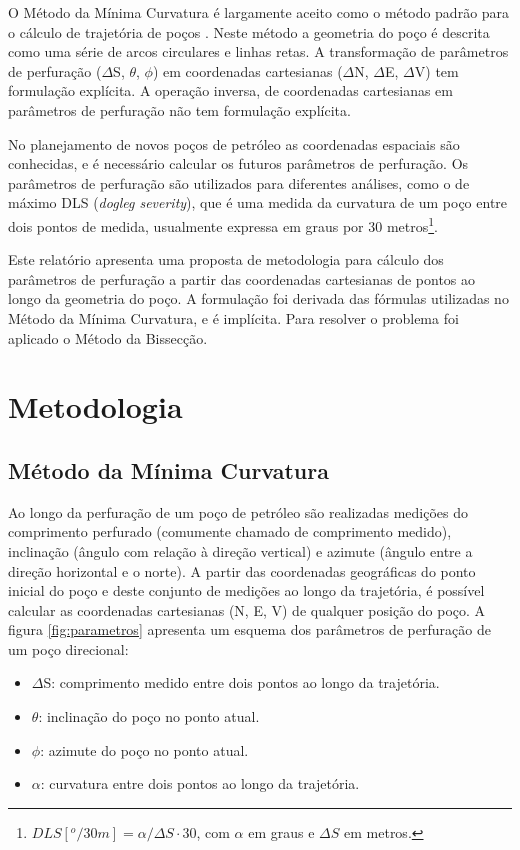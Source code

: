 \documentclass[final,3p,12pt]{elsarticle}
\begin{document}
O Método da Mínima Curvatura é largamente aceito como o método padrão para o cálculo de trajetória de poços \cite{10.2118/84246-MS}. Neste método a geometria do poço é descrita como uma série de arcos circulares e linhas retas. A transformação de parâmetros de perfuração ($\Delta$S, $\theta$, $\phi$) em coordenadas cartesianas ($\Delta$N, $\Delta$E, $\Delta$V) tem formulação explícita. A operação inversa, de coordenadas cartesianas em parâmetros de perfuração não tem formulação explícita.

No planejamento de novos poços de petróleo as coordenadas espaciais são conhecidas, e é necessário calcular os futuros parâmetros de perfuração. Os parâmetros de perfuração são utilizados para diferentes análises, como o de máximo DLS (\emph{dogleg severity}), que é uma medida da curvatura de um poço entre dois pontos de medida, usualmente expressa em graus por 30 metros\footnote{$DLS[^o/30 m] = \alpha / \Delta S \cdot 30$, com $\alpha$ em graus e $\Delta S$ em metros.}.

Este relatório apresenta uma proposta de metodologia para cálculo dos parâmetros de perfuração a partir das coordenadas cartesianas de pontos ao longo da geometria do poço. A formulação foi derivada das fórmulas utilizadas no Método da Mínima Curvatura, e é implícita. Para resolver o problema foi aplicado o Método da Bissecção.

\section{Metodologia}

\subsection{Método da Mínima Curvatura}  \label{subsec:metodominimacurvatura}

Ao longo da perfuração de um poço de petróleo são realizadas medições do comprimento perfurado (comumente chamado de comprimento medido), inclinação (ângulo com relação à direção vertical) e azimute (ângulo entre a direção horizontal e o norte). A partir das coordenadas geográficas do ponto inicial do poço e deste conjunto de medições ao longo da trajetória, é possível calcular as coordenadas cartesianas (N, E, V) de qualquer posição do poço. A figura \ref{fig:parametros} apresenta um esquema dos parâmetros de perfuração de um poço direcional:
\begin{itemize}
    \item $\Delta$S: comprimento medido entre dois pontos ao longo da trajetória.
    \item $\theta$: inclinação do poço no ponto atual.
    \item $\phi$: azimute do poço no ponto atual.
    \item $\alpha$: curvatura entre dois pontos ao longo da trajetória.
\end{itemize}
\end{document}
